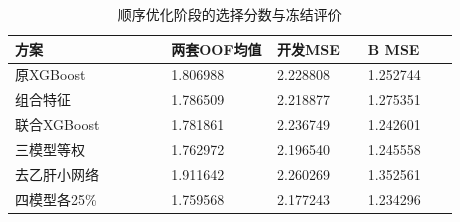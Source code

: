 \begin{table}[htbp]
\small
\setlength{\tabcolsep}{5pt}
\centering
\caption{顺序优化阶段的选择分数与冻结评价}
\label{tab:stages}
\begin{tabular}{L{0.31\linewidth}L{0.21\linewidth}L{0.18\linewidth}L{0.18\linewidth}}
\toprule
方案 & 两套OOF均值 & 开发MSE & B MSE \\
\midrule
原XGBoost & 1.806988 & 2.228808 & 1.252744 \\
组合特征 & 1.786509 & 2.218877 & 1.275351 \\
联合XGBoost & 1.781861 & 2.236749 & 1.242601 \\
三模型等权 & 1.762972 & 2.196540 & 1.245558 \\
去乙肝小网络 & 1.911642 & 2.260269 & 1.352561 \\
四模型各25\% & 1.759568 & 2.177243 & 1.234296 \\
\bottomrule
\end{tabular}
\end{table}
